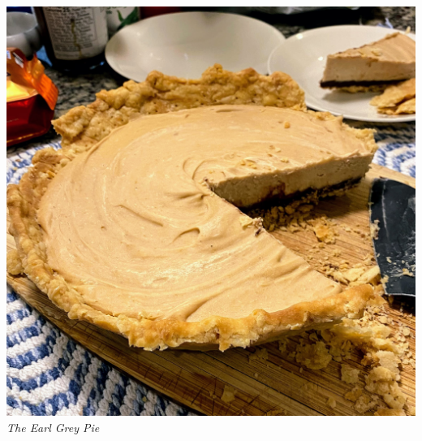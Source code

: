 \documentclass[12pt]{article}
\begin{document}
\begin{multicols}{2}
    \includegraphics[width=\linewidth]{assets/earl_gray_pie.jpg}
    \centering
    \textit{The Earl Grey Pie}
\end{multicols}

\newpage
\end{document}
